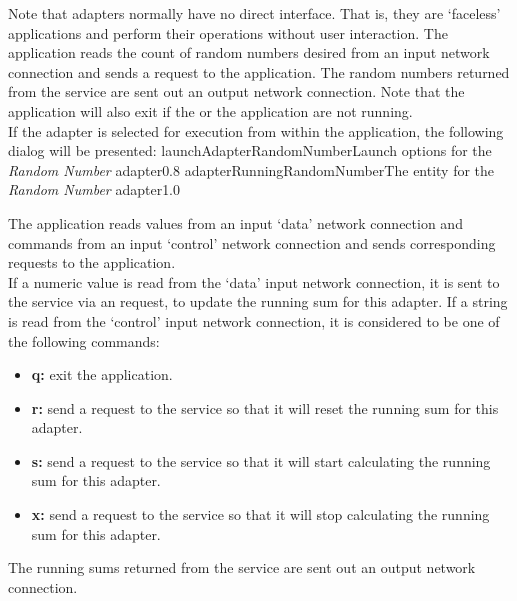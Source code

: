 Note that adapters normally have no direct interface.
That is, they are `faceless' applications and perform their operations without user
interaction.
\condPage
{}
The  application reads the count of
random numbers desired from an input \yarp{} network connection and sends a
 request to the
 application.
The random numbers returned from the service are sent out an output \yarp{} network
connection.
Note that the application will also exit if the  or the
 application are not running.\\

\insertStandardAdapterCommands{}
If the adapter is selected for execution from within the \emph{\MMMU} application, the
following dialog will be presented:
%
{launchAdapterRandomNumber}{Launch options for the \emph{Random Number} adapter}{0.8}
\condPage
{}%
{adapterRunningRandomNumber}{The \emph{\MMMU} entity for the \emph{Random Number}
adapter}{1.0}

The  application reads  values from an input
`data' \yarp{} network connection and commands from an input `control' \yarp{} network
connection and sends corresponding requests to the
 application.\\

If a numeric value is read from the `data' input \yarp{} network connection, it is sent to
the service via an  request, to update the
running sum for this adapter.
If a string is read from the `control' input \yarp{} network connection, it is considered
to be one of the following commands:
\begin{itemize}
\item\textbf{q:} exit the application.
\item\exSp\textbf{r:} send a  request to the
service so that it will reset the running sum for this adapter.
\item\exSp\textbf{s:} send a  request to the
service so that it will start calculating the running sum for this adapter.
\item\exSp\textbf{x:} send a  request to the
service so that it will stop calculating the running sum for this adapter.
\end{itemize}
The running sums returned from the service are sent out an output \yarp{} network
connection.\\

